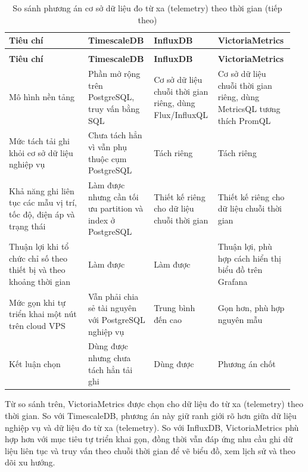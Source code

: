 \documentclass[a4paper]{extarticle}
\newcommand{\thesissettableid}[2]{%
  \renewcommand{\thetable}{#1}%
  \renewcommand{\theHtable}{#2}%
}
\begin{document}
{\thesissettableid{3.27}{condensed-bang-3-27-so-sanh-phuong-an-co-so-du-lieu-do-tu-xa-telemetry-theo-thoi-gian}
\def\LTcaptype{table}
\begin{longtable}{|L{0.271\linewidth}|L{0.216\linewidth}|L{0.203\linewidth}|L{0.261\linewidth}|}
\caption{So sánh phương án cơ sở dữ liệu đo từ xa (telemetry) theo thời gian}\label{tab:condensed-bang-3-27-so-sanh-phuong-an-co-so-du-lieu-do-tu-xa-telemetry-theo-thoi-gian}\\
\hline
\textbf{Tiêu chí} & \textbf{TimescaleDB} & \textbf{InfluxDB} & \textbf{VictoriaMetrics} \\
\hline
\endfirsthead
\caption[]{So sánh phương án cơ sở dữ liệu đo từ xa (telemetry) theo thời gian (tiếp theo)}\\
\hline
\textbf{Tiêu chí} & \textbf{TimescaleDB} & \textbf{InfluxDB} & \textbf{VictoriaMetrics} \\
\hline
\endhead
\endfoot
\endlastfoot
Mô hình nền tảng & Phần mở rộng trên PostgreSQL, truy vấn bằng SQL & Cơ sở dữ liệu chuỗi thời gian riêng, dùng Flux/InfluxQL & Cơ sở dữ liệu chuỗi thời gian riêng, dùng MetricsQL tương thích PromQL \\\hline
Mức tách tải ghi khỏi cơ sở dữ liệu nghiệp vụ & Chưa tách hẳn vì vẫn phụ thuộc cụm PostgreSQL & Tách riêng & Tách riêng \\\hline
Khả năng ghi liên tục các mẫu vị trí, tốc độ, điện áp và trạng thái & Làm được nhưng cần tối ưu partition và index ở PostgreSQL & Thiết kế riêng cho dữ liệu chuỗi thời gian & Thiết kế riêng cho dữ liệu chuỗi thời gian \\\hline
Thuận lợi khi tổ chức chỉ số theo thiết bị và theo khoảng thời gian & Làm được & Làm được & Thuận lợi, phù hợp cách hiển thị biểu đồ trên Grafana \\\hline
Mức gọn khi tự triển khai một nút trên cloud VPS & Vẫn phải chia sẻ tài nguyên với PostgreSQL nghiệp vụ & Trung bình đến cao & Gọn hơn, phù hợp nguyên mẫu \\\hline
Kết luận chọn & Dùng được nhưng chưa tách hẳn tải ghi & Dùng được & Phương án chốt \\\hline
\end{longtable}
}

Từ so sánh trên, VictoriaMetrics được chọn cho dữ liệu đo từ xa (telemetry) theo thời gian. So
với TimescaleDB, phương án này giữ ranh giới rõ hơn giữa dữ liệu nghiệp vụ và
dữ liệu đo từ xa (telemetry). So với InfluxDB, VictoriaMetrics phù hợp hơn với mục tiêu tự
triển khai gọn, đồng thời vẫn đáp ứng nhu cầu ghi dữ liệu liên tục và truy vấn
theo chuỗi thời gian để vẽ biểu đồ, xem lịch sử và theo dõi xu hướng.
\end{document}
